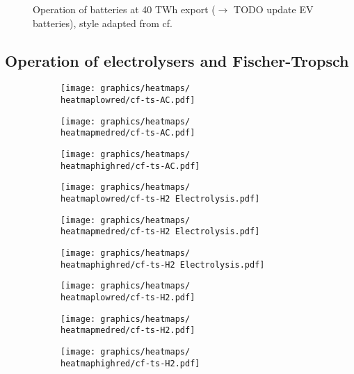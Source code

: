 \begin{figure}[h]
    \caption{Operation of batteries at 40 TWh export ($\rightarrow$ TODO update EV batteries), style adapted from cf. \cite{Neumann2022}}
    \label{fig:battery_operation}
\end{figure}



\subsection{Operation of electrolysers and Fischer-Tropsch}


\begin{figure}[h]
    \centering
        \begin{subfigure}[h]{0.33\textwidth}
            \centering
        \texttt{[image: graphics/heatmaps/\\heatmaplowred/cf-ts-AC.pdf]}
    \end{subfigure}
    \begin{subfigure}[h]{0.33\textwidth}
        \centering
        \texttt{[image: graphics/heatmaps/\\heatmapmedred/cf-ts-AC.pdf]}
    \end{subfigure}
    \begin{subfigure}[h]{0.33\textwidth}
        \centering
        \texttt{[image: graphics/heatmaps/\\heatmaphighred/cf-ts-AC.pdf]}
    \end{subfigure}


    \begin{subfigure}[h]{0.33\textwidth}
        \centering
        \texttt{[image: graphics/heatmaps/\\heatmaplowred/cf-ts-H2 Electrolysis.pdf]}
    \end{subfigure}
    \begin{subfigure}[h]{0.33\textwidth}
        \centering
        \texttt{[image: graphics/heatmaps/\\heatmapmedred/cf-ts-H2 Electrolysis.pdf]}
    \end{subfigure}
    \begin{subfigure}[h]{0.33\textwidth}
        \centering
        \texttt{[image: graphics/heatmaps/\\heatmaphighred/cf-ts-H2 Electrolysis.pdf]}
    \end{subfigure}

    \begin{subfigure}[h]{0.33\textwidth}
        \centering
        \texttt{[image: graphics/heatmaps/\\heatmaplowred/cf-ts-H2.pdf]}
    \end{subfigure}
    \begin{subfigure}[h]{0.33\textwidth}
        \centering
        \texttt{[image: graphics/heatmaps/\\heatmapmedred/cf-ts-H2.pdf]}
    \end{subfigure}
    \begin{subfigure}[h]{0.33\textwidth}
        \centering
        \texttt{[image: graphics/heatmaps/\\heatmaphighred/cf-ts-H2.pdf]}
        

\end{subfigure}
\end{figure}
